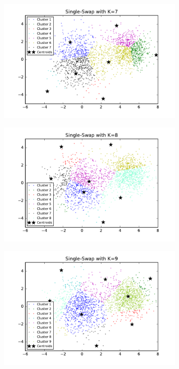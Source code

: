 \begin{description}
\begin{description}
\begin{figure}[!h]
\begin{subfigure}[b]{0.475\textwidth}
            \includegraphics[width=\textwidth]{./figures/clustering_singleSwap_7.pdf}
        \end{subfigure}
        \hfill
        \begin{subfigure}[b]{0.475\textwidth}  
            \centering 
            \includegraphics[width=\textwidth]{./figures/clustering_singleSwap_8.pdf}
        \end{subfigure}
        \begin{subfigure}[b]{0.475\textwidth}   
            \centering 
            \includegraphics[width=\textwidth]{./figures/clustering_singleSwap_9.pdf}

\end{subfigure}
\end{figure}
\end{description}
\end{description}
